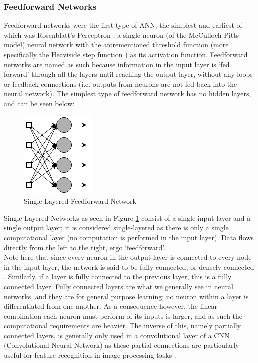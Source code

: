 \documentclass[12pt]{article}
\begin{document}
\subsubsection{Feedforward Networks}\label{ffnets}
Feedforward networks were the first type of ANN, the simplest and earliest of which was Rosenblatt's Perceptron \autocite{rosenblatt1958perceptron}; a single neuron (of the McCulloch-Pitts model) neural network with the aforementioned threshold function (more specifically the Heaviside step function \autocite{8093960}) as its activation function. Feedforward networks are named as such because information in the input layer is `fed forward' through all the layers until reaching the output layer, without any loops or feedback connections (i.e. outputs from neurons are not fed back into the neural network). The simplest type of feedforward network has no hidden layers, and can be seen below:
\begin{figure}[H]
    \centering
    \includegraphics[scale=0.7]{3.png}
    \caption{Single-Layered Feedforward Network}
    \label{singlelayer}
\end{figure}
Single-Layered Networks as seen in Figure \ref{singlelayer} consist of a single input layer and a single output layer; it is considered single-layered as there is only a single computational layer (no computation is performed in the input layer). Data flows directly from the left to the right, ergo `feedforward'. \\\newline Note here that since every neuron in the output layer is connected to every node in the input layer, the network is said to be fully connected, or densely connected \autocite{haykin2010neural}. Similarly, if a layer is fully connected to the previous layer, this is a fully connected layer. Fully connected layers are what we generally see in neural networks, and they are for general purpose learning; no neuron within a layer is differentiated from one another. As a consequence however, the linear combination each neuron must perform of its inputs is larger, and as such the computational requirements are heavier. The inverse of this, namely partially connected layers, is generally only used in a convolutional layer of a CNN (Convolutional Neural Network) as these partial connections are particularly useful for feature recognition in image processing tasks \autocite{8308186}.\\\newline
\end{document}
